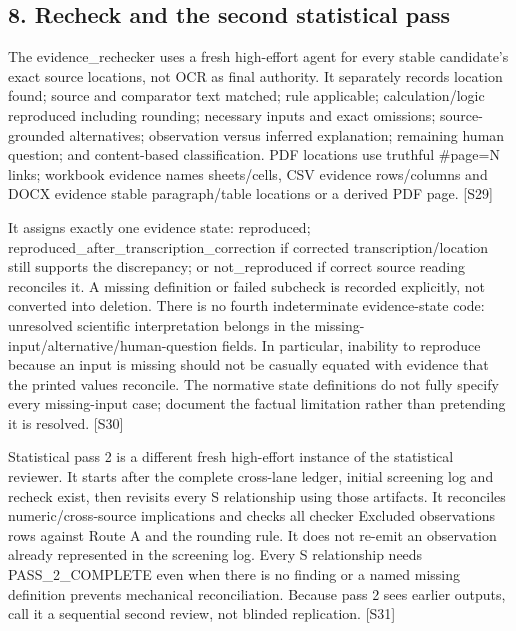 \documentclass[10pt,a4paper]{article}
\begin{document}
\subsection*{8.\allowbreak{} Recheck and the second statistical pass}
The evidence\_\allowbreak{}rechecker uses a fresh high-\allowbreak{}effort agent for every stable candidate's exact source locations, not OCR as final authority.\allowbreak{} It separately records location found; source and comparator text matched; rule applicable; calculation/\allowbreak{}logic reproduced including rounding; necessary inputs and exact omissions; source-\allowbreak{}grounded alternatives; observation versus inferred explanation; remaining human question; and content-\allowbreak{}based classification.\allowbreak{} PDF locations use truthful \#page=N links; workbook evidence names sheets/\allowbreak{}cells, CSV evidence rows/\allowbreak{}columns and DOCX evidence stable paragraph/\allowbreak{}table locations or a derived PDF page.\allowbreak{} [S29]\par
It assigns exactly one evidence state: reproduced; reproduced\_\allowbreak{}after\_\allowbreak{}transcription\_\allowbreak{}correction if corrected transcription/\allowbreak{}location still supports the discrepancy; or not\_\allowbreak{}reproduced if correct source reading reconciles it.\allowbreak{} A missing definition or failed subcheck is recorded explicitly, not converted into deletion.\allowbreak{} There is no fourth indeterminate evidence-\allowbreak{}state code: unresolved scientific interpretation belongs in the missing-\allowbreak{}input/\allowbreak{}alternative/\allowbreak{}human-\allowbreak{}question fields.\allowbreak{} In particular, inability to reproduce because an input is missing should not be casually equated with evidence that the printed values reconcile.\allowbreak{} The normative state definitions do not fully specify every missing-\allowbreak{}input case; document the factual limitation rather than pretending it is resolved.\allowbreak{} [S30]\par
Statistical pass 2 is a different fresh high-\allowbreak{}effort instance of the statistical reviewer.\allowbreak{} It starts after the complete cross-\allowbreak{}lane ledger, initial screening log and recheck exist, then revisits every S relationship using those artifacts.\allowbreak{} It reconciles numeric/\allowbreak{}cross-\allowbreak{}source implications and checks all checker Excluded observations rows against Route A and the rounding rule.\allowbreak{} It does not re-\allowbreak{}emit an observation already represented in the screening log.\allowbreak{} Every S relationship needs PASS\_\allowbreak{}2\_\allowbreak{}COMPLETE even when there is no finding or a named missing definition prevents mechanical reconciliation.\allowbreak{} Because pass 2 sees earlier outputs, call it a sequential second review, not blinded replication.\allowbreak{} [S31]\par
\end{document}
